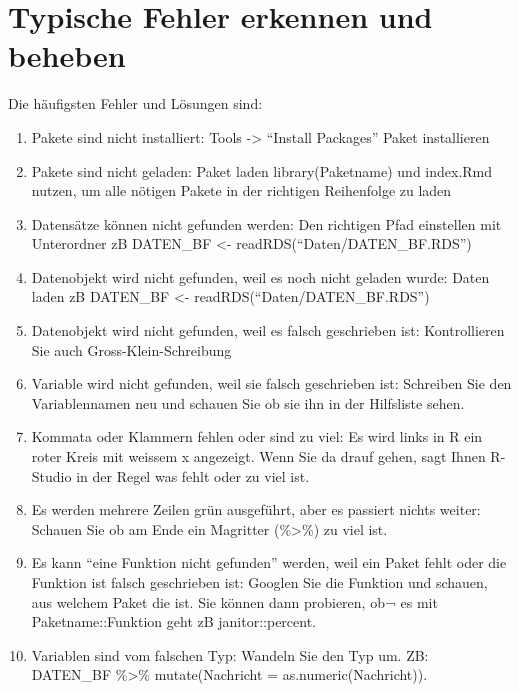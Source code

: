 \documentclass[twoside, pagesize, fontsize=11pt, dvipsnames]{scrreport}
\begin{document}
\hypertarget{typische-fehler-erkennen-und-beheben}{%
\section{Typische Fehler erkennen und
beheben}\label{typische-fehler-erkennen-und-beheben}}

Die häufigsten Fehler und Lösungen sind:

\begin{enumerate}
\def\labelenumi{\arabic{enumi}.}
\item
  Pakete sind nicht installiert: Tools -\textgreater{} \enquote{Install
  Packages} Paket installieren
\item
  Pakete sind nicht geladen: Paket laden library(Paketname) und
  index.Rmd nutzen, um alle nötigen Pakete in der richtigen Reihenfolge
  zu laden
\item
  Datensätze können nicht gefunden werden: Den richtigen Pfad einstellen
  mit Unterordner zB DATEN\_BF \textless-
  readRDS(\enquote{Daten/DATEN\_BF.RDS})
\item
  Datenobjekt wird nicht gefunden, weil es noch nicht geladen wurde:
  Daten laden zB DATEN\_BF \textless-
  readRDS(\enquote{Daten/DATEN\_BF.RDS})
\item
  Datenobjekt wird nicht gefunden, weil es falsch geschrieben ist:
  Kontrollieren Sie auch Gross-Klein-Schreibung
\item
  Variable wird nicht gefunden, weil sie falsch geschrieben ist:
  Schreiben Sie den Variablennamen neu und schauen Sie ob sie ihn in der
  Hilfsliste sehen.
\item
  Kommata oder Klammern fehlen oder sind zu viel: Es wird links in R ein
  roter Kreis mit weissem x angezeigt. Wenn Sie da drauf gehen, sagt
  Ihnen R-Studio in der Regel was fehlt oder zu viel ist.
\item
  Es werden mehrere Zeilen grün ausgeführt, aber es passiert nichts
  weiter: Schauen Sie ob am Ende ein Magritter (\%\textgreater\%) zu
  viel ist.
\item
  Es kann \enquote{eine Funktion nicht gefunden} werden, weil ein Paket
  fehlt oder die Funktion ist falsch geschrieben ist: Googlen Sie die
  Funktion und schauen, aus welchem Paket die ist. Sie können dann
  probieren, ob¬ es mit Paketname::Funktion geht zB janitor::percent.
\item
  Variablen sind vom falschen Typ: Wandeln Sie den Typ um. ZB: DATEN\_BF
  \%\textgreater\% mutate(Nachricht = as.numeric(Nachricht)).
\end{enumerate}
\end{document}
